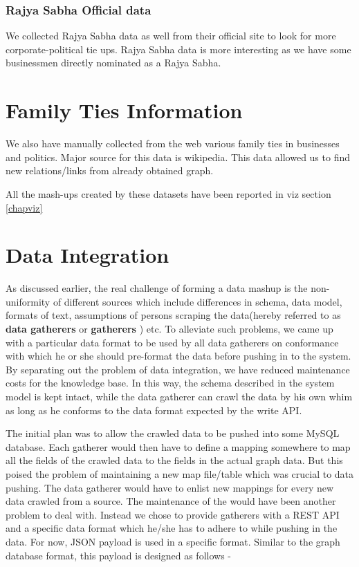 \subsubsection{Rajya Sabha Official data}

We collected Rajya Sabha data as well from their official site to look for more corporate-political tie ups. Rajya Sabha data is more interesting as we have some businessmen directly nominated as a Rajya Sabha.  

\section{Family Ties Information}

We also have manually collected from the web various family ties in businesses and politics. Major source for this data is wikipedia. This data allowed us to find new relations/links from already obtained graph.\cite{indianbfamilies} \cite{indianpfamilies}


All the mash-ups created by these datasets have been reported in viz section \ref{chapviz}

\section{Data Integration}
\label{dataint}

As discussed earlier, the real challenge of forming a data mashup is the non-uniformity of different sources which include differences in schema, data model, formats of text, assumptions of persons scraping the data(hereby referred to as \textbf{ data gatherers } or \textbf{ gatherers }) etc. To alleviate such problems, we came up with a particular data format to be used by all data gatherers on conformance with which he or she should pre-format the data before pushing in to the system. By separating out the problem of data integration, we have reduced maintenance costs for the knowledge base. In this way, the schema described in the system model is kept intact, while the data gatherer can crawl the data by his own whim as long as he conforms to the data format expected by the write API.

The initial plan was to allow the crawled data to be pushed into some MySQL database. Each gatherer would then have to define a mapping somewhere to map all the fields of the crawled data to the fields in the actual graph data. But this poised the problem of maintaining a new map file/table which was crucial to data pushing. The data gatherer would have to enlist new mappings for every new data crawled from a source. The maintenance of the  would have been another problem to deal with.
%
Instead we chose to provide gatherers with a REST API and  a specific data format which he/she has to adhere to while pushing in the data.
For now, JSON payload is used in a specific format. Similar to the graph database format, this payload is designed as follows -

